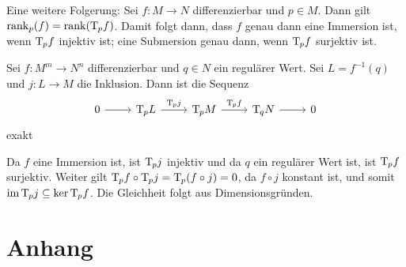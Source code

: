 Eine weitere Folgerung:
Sei $f \colon M\to N$ differenzierbar und $p \in M$.
Dann gilt $\operatorname{rank} _p(f) = \operatorname{rank}(\mathrm{T}\mkern-0.85mu_p f)$.
Damit folgt dann, dass $f$ genau dann eine Immersion ist, wenn $\mathrm{T}\mkern-0.85mu_p f$ injektiv ist; eine Submersion genau dann, wenn $\mathrm{T}\mkern-0.85mu_p f$ surjektiv ist.

\begin{lemma}
	Sei $f \colon M^m \to N^n$ differenzierbar und $q \in N$ ein regulärer Wert.
	Sei $L = f^{-1}(q)$ und $j \colon L \to M$ die Inklusion.
	Dann ist die Sequenz
	\[
		\begin{tikzcd}
			0 \rar & \Tang_p L \rar["\Tang_p j"] & \Tang_p M \rar["\Tang_p f"] & \Tang_q N \rar & 0
		\end{tikzcd}
	\]
	exakt 
\end{lemma}
\begin{beweis}
	Da $f$ eine Immersion ist, ist $\mathrm{T}\mkern-0.85mu_p j$ injektiv und da $q$ ein regulärer Wert ist, ist $\mathrm{T}\mkern-0.85mu_p f$ surjektiv.
	Weiter gilt $\mathrm{T}\mkern-0.85mu_p f \circ \mathrm{T}\mkern-0.85mu_p j = \mathrm{T}\mkern-0.85mu_p(f \circ j) =0$, da $f \circ j$ konstant ist, und somit $\operatorname{im} \mathrm{T}\mkern-0.85mu_p j \subseteq \ker \mathrm{T}\mkern-0.85mu_p f$.
	Die Gleichheit folgt aus Dimensionsgründen.
\end{beweis}


\cleardoubleoddemptypage
{}
\setcounter{page}{1}
\cleardoubleoddemptypage
\appendix

\chapter{Anhang} %
\label{sec:anhang}

\printindex
\printbibliography
\listoffigures
{}
\todototoc

